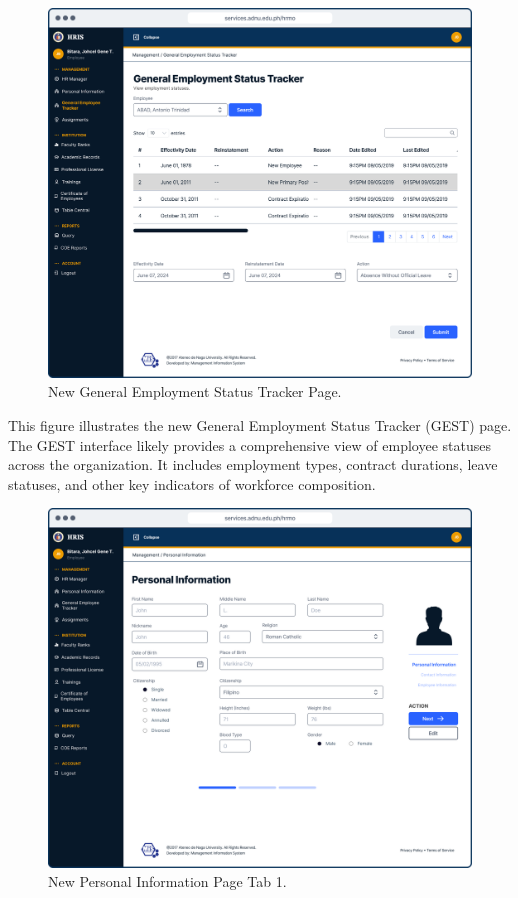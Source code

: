     \begin{figure}[H]
        \centering
        \includegraphics[width=1\linewidth]{figures/app/gest.png}
        \caption{New General Employment Status Tracker Page.}
        \label{fig:app-gest}
    \end{figure}

    This figure illustrates the new General Employment Status Tracker (GEST) page. The GEST interface likely provides a comprehensive view of employee statuses across the organization. It includes employment types, contract durations, leave statuses, and other key indicators of workforce composition. 

    \begin{figure}[H]
        \centering
        \includegraphics[width=1\linewidth]{figures/app/pi-1.png}
        \caption{New Personal Information Page Tab 1.}
        \label{fig:app-pi-1}
    \end{figure}

